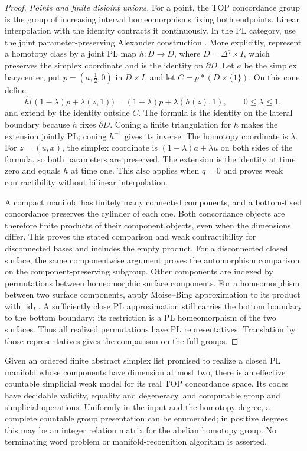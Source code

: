 \begin{proof}
\medskip\noindent\textit{Points and finite disjoint unions.}
For a point, the TOP concordance group is the group of increasing
interval homeomorphisms fixing both endpoints.  Linear interpolation
with the identity contracts it continuously.  In the PL category,
use the joint parameter-preserving Alexander construction
\cite[Theorem~2.2.1 and proof, p.~223]{Hamstrom1974}.
More explicitly, represent a homotopy class by a joint PL map
$h:D\to D$, where $D=\Delta^q\times I$, which preserves the simplex
coordinate and is the identity on $\partial D$.
Let $a$ be the simplex barycenter, put $p=(a,\tfrac12,0)$ in $D\times I$,
and let $C=p*(D\times\{1\})$.  On this cone define
\[
 \widehat h\bigl((1-\lambda)p+\lambda(z,1)\bigr)
   =(1-\lambda)p+\lambda(h(z),1),
 \qquad 0\leq\lambda\leq1,
\]
and extend by the identity outside $C$.  The formula is the identity
on the lateral boundary because $h$ fixes $\partial D$.
Coning a finite triangulation for $h$ makes the extension jointly PL;
coning $h^{-1}$ gives its inverse.  The homotopy coordinate is $\lambda$.
For $z=(u,x)$, the simplex coordinate is
$(1-\lambda)a+\lambda u$ on both sides of the formula, so both
parameters are preserved.  The extension is the identity at time zero
and equals $h$ at time one.  This also applies when $q=0$ and proves
weak contractibility without bilinear interpolation.

A compact manifold has finitely many connected components, and a
bottom-fixed concordance preserves the cylinder of each one.
Both concordance objects are therefore finite products of their
component objects, even when the dimensions differ.  This proves
the stated comparison and weak contractibility for disconnected
bases and includes the empty product.  For a disconnected closed
surface, the same componentwise argument proves the automorphism
comparison on the component-preserving subgroup.  Other components
are indexed by permutations between homeomorphic surface components.
For a homeomorphism between two surface components, apply Moise--Bing
approximation to its product with $\operatorname{id}_I$.  A sufficiently
close PL approximation still carries the bottom boundary to the bottom
boundary; its restriction is a PL homeomorphism of the two surfaces.
Thus all realized permutations have PL representatives.  Translation
by those representatives gives the comparison on the full groups.
\end{proof}

\begin{corollary}\label{cor:effective-low-dimensional-top-models}
Given an ordered finite abstract simplex list promised to realize a
closed PL manifold whose components have dimension at most two,
there is an effective countable simplicial weak model for its real
TOP concordance space.  Its codes have decidable validity, equality
and degeneracy, and computable group and simplicial operations.
Uniformly in the input and the homotopy degree, a complete countable
group presentation can be enumerated; in positive degrees this may
be an integer relation matrix for the abelian homotopy group.
No terminating word problem or manifold-recognition algorithm is
asserted.
\end{corollary}

